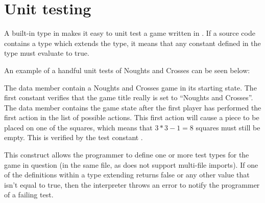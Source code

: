 \section{Unit testing}
\label{sec:unittesting}
A built-in type in \productname{} makes it easy to unit test a game
written in \productname{}. If a source code contains a type which
extends the  type, it means that any constant defined
in the type must evaluate to true.

An example of a handful unit tests of Noughts and Crosses can be seen
below:


The data member  contain a Noughts and Crosses game in
its starting state. The first constant  verifies
that the game title really is set to ``Noughts and Crosses''. The data
member  contains the game state after the first player
has performed the first action in the list of possible actions. This
first action will cause a piece to be placed on one of the squares,
which means that $3*3 - 1 = 8$ squares must still be empty. This is
verified by the test constant .

This construct allows the programmer to define one or more test types
for the game in question (in the same file, as \productname{} does not
support multi-file imports). If one of the definitions within a type
extending  returns false or any other value that isn't
equal to true, then the interpreter throws an
error to notify the programmer of a failing test.
